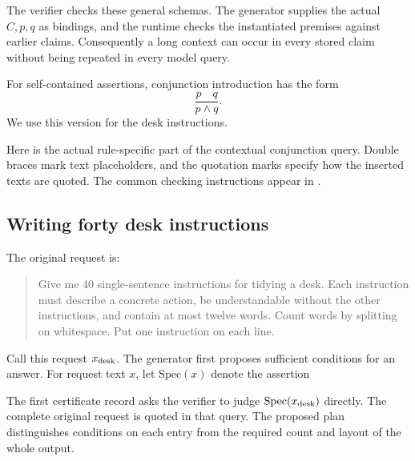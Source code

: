 \documentclass[11pt,twoside]{article}
\theoremstyle{definition}
\begin{document}
The verifier checks these general schemas. The generator supplies the actual
$C,p,q$ as bindings, and the runtime checks the instantiated premises against
earlier claims. Consequently a long context can occur in every stored claim
without being repeated in every model query.

For self-contained assertions, conjunction introduction has the form
\begin{equation}
\frac{p\quad q}{p\wedge q}.
\label{eq:plain-and}
\end{equation}
We use this version for the desk instructions.

Here is the actual rule-specific part of the contextual conjunction query.
Double braces mark text placeholders, and the quotation marks specify how
the inserted texts are quoted. The common checking instructions appear in
.
\begin{quote}

\end{quote}

\subsection{Writing forty desk instructions}

The original request is:
\begin{quote}
Give me 40 single-sentence instructions for tidying a desk. Each instruction
must describe a concrete action, be understandable without the other
instructions, and contain at most twelve words. Count words by splitting
on whitespace. Put one instruction on each line.
\end{quote}
Call this request $x_{\rm desk}$. The generator first proposes sufficient
conditions for an answer. For request text $x$, let $\mathrm{Spec}(x)$ denote
the assertion
\begin{quote}

\end{quote}
The first certificate record asks the verifier to judge
$\mathrm{Spec}(x_{\rm desk})$ directly. The complete original request is
quoted in that query. The proposed plan distinguishes conditions on each
entry from the required count and layout of the whole output.
\end{document}
